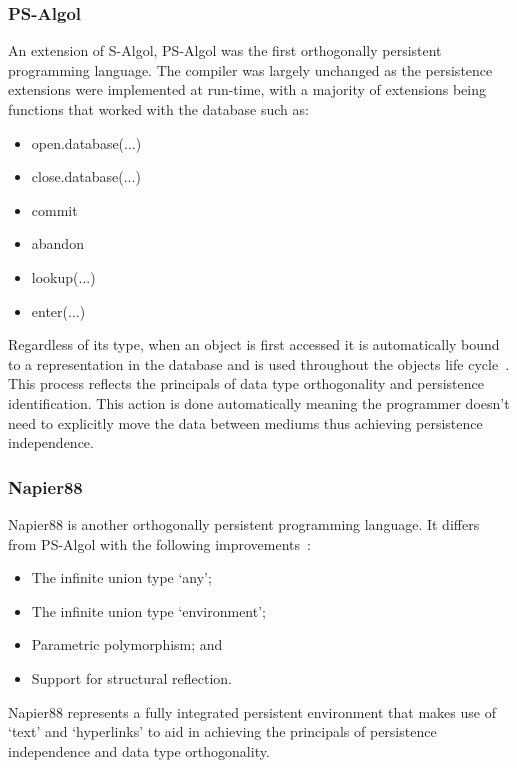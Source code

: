 \documentclass[a4paper,12pt]{article}
\begin{document}
\subsubsection{PS-Algol}
An extension of S-Algol, PS-Algol was the first orthogonally persistent programming language. The compiler was largely unchanged as the persistence extensions were implemented at run-time, with a majority of extensions being functions that worked with the database such as:
\begin{itemize}
    \item{open.database(...)}
    \item{close.database(...)}
    \item{commit}
    \item{abandon}
    \item{lookup(...)}
    \item{enter(...)}
\end{itemize}
Regardless of its type, when an object is first accessed it is automatically bound to a representation in the database and is used throughout the objects life cycle~\citep{psalgol}. This process reflects the principals of data type orthogonality and persistence identification. This action is done automatically meaning the programmer doesn't need to explicitly move the data between mediums thus achieving persistence independence.
\subsubsection{Napier88}
Napier88 is another orthogonally persistent programming language\citep{napier}. It differs from PS-Algol with the following improvements~\citep{ADearle}:
\begin{itemize}
    \item{The infinite union type `any';}
    \item{The infinite union type `environment';} 
    \item{Parametric polymorphism; and}
    \item{Support for structural reflection.}
\end{itemize}
Napier88 represents a fully integrated persistent environment that makes use of `text' and `hyperlinks' to aid in achieving the principals of persistence independence and data type orthogonality.
\end{document}
